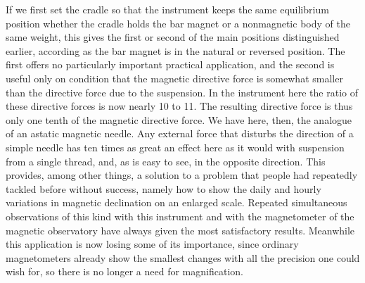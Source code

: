 If we first set the cradle so that the instrument keeps the same equilibrium position whether the cradle holds the bar magnet or a nonmagnetic body of the same weight, this gives the first or second of the main positions distinguished earlier, according as the bar magnet is in the natural or reversed position. The first offers no particularly important practical application, and the second is useful only on condition that the magnetic directive force is somewhat smaller than the directive force due to the suspension. In the instrument here the ratio of these directive forces is now nearly 10 to 11. The resulting directive force is thus only one tenth of the magnetic directive force. We have here, then, the analogue of an astatic magnetic needle. Any external force that disturbs the direction of a simple needle has ten times as great an effect here as it would with suspension from a single thread, and, as is easy to see, in the opposite direction. This provides, among other things, a solution to a problem that people had repeatedly tackled before without success, namely how to show the daily and hourly variations in magnetic declination on an enlarged scale. Repeated simultaneous observations of this kind with this instrument and with the magnetometer of the magnetic observatory have always given the most satisfactory results. Meanwhile this application is now losing some of its importance, since ordinary magnetometers already show the smallest changes with all the precision one could wish for, so there is no longer a need for magnification.

